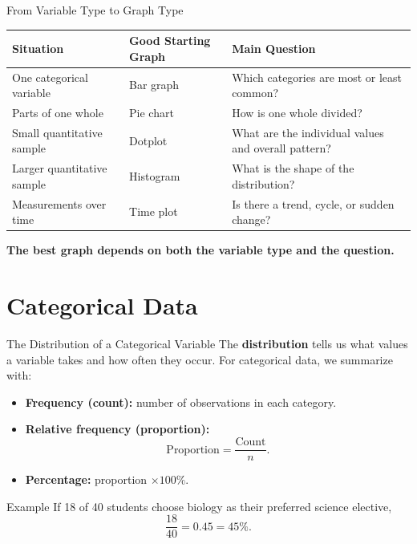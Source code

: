 \documentclass[aspectratio=169]{beamer}
\begin{document}
\begin{frame}{From Variable Type to Graph Type}
  \begin{table}
    \centering
    \small
    \begin{tabularx}{\textwidth}{>{\raggedright\arraybackslash}X >{\raggedright\arraybackslash}X >{\raggedright\arraybackslash}X}
      \toprule
      \textbf{Situation} & \textbf{Good Starting Graph} & \textbf{Main Question} \\
      \midrule
      One categorical variable & Bar graph & Which categories are most or least common? \\
      Parts of one whole & Pie chart & How is one whole divided? \\
      Small quantitative sample & Dotplot & What are the individual values and overall pattern? \\
      Larger quantitative sample & Histogram & What is the shape of the distribution? \\
      Measurements over time & Time plot & Is there a trend, cycle, or sudden change? \\
      \bottomrule
    \end{tabularx}
  \end{table}
  \vspace{0.1cm}
  \centering
  \textbf{The best graph depends on both the variable type and the question.}
\end{frame}

\section{Categorical Data}

\begin{frame}{The Distribution of a Categorical Variable}
  The \textbf{distribution} tells us what values a variable takes and how often they occur.
  \vspace{0.15cm}
  For categorical data, we summarize with:
  \begin{itemize}
    \item \textbf{Frequency (count):} number of observations in each category.
    \item \textbf{Relative frequency (proportion):}
    \[
      \text{Proportion} = \frac{\text{Count}}{n}.
    \]
    \item \textbf{Percentage:} proportion $\times 100\%$.
  \end{itemize}
  \begin{block}{Example}
    If 18 of 40 students choose biology as their preferred science elective,
    \[
      \frac{18}{40}=0.45=45\%.
    \]
  \end{block}
\end{frame}
\end{document}

